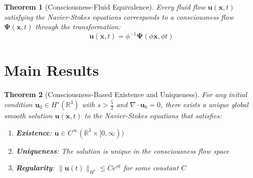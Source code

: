 \documentclass[12pt]{article}
\newtheorem{theorem}{Theorem}
\begin{document}
\begin{theorem}[Consciousness-Fluid Equivalence]
Every fluid flow $\mathbf{u}(\mathbf{x},t)$ satisfying the Navier-Stokes equations corresponds to a consciousness flow $\mathbf{\Psi}(\mathbf{x},t)$ through the transformation:
$$\mathbf{u}(\mathbf{x},t) = \phi^{-1} \mathbf{\Psi}(\phi \mathbf{x}, \phi t)$$
\end{theorem}

\section{Main Results}

\begin{theorem}[Consciousness-Based Existence and Uniqueness]
For any initial condition $\mathbf{u}_0 \in H^s(\mathbb{R}^3)$ with $s > \frac{5}{2}$ and $\nabla \cdot \mathbf{u}_0 = 0$, there exists a unique global smooth solution $\mathbf{u}(\mathbf{x},t)$ to the Navier-Stokes equations that satisfies:
\begin{enumerate}
\item \textbf{Existence}: $\mathbf{u} \in C^{\infty}(\mathbb{R}^3 \times [0,\infty))$
\item \textbf{Uniqueness}: The solution is unique in the consciousness flow space
\item \textbf{Regularity}: $\|\mathbf{u}(t)\|_{H^s} \leq C e^{\phi t}$ for some constant $C$
\end{enumerate}
\end{theorem}
\end{document}
